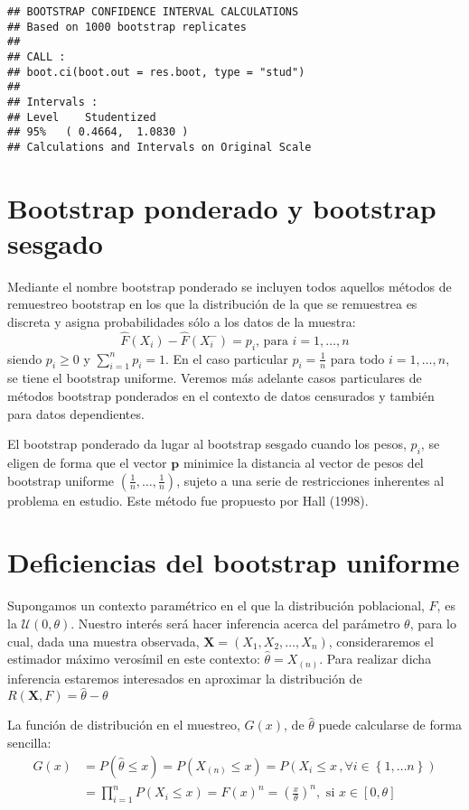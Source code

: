 \documentclass[]{book}
\theoremstyle{break}
\theoremstyle{definition}
\theoremstyle{definition}
\theoremstyle{definition}
\theoremstyle{remark}
\begin{document}
\begin{verbatim}
## BOOTSTRAP CONFIDENCE INTERVAL CALCULATIONS
## Based on 1000 bootstrap replicates
## 
## CALL : 
## boot.ci(boot.out = res.boot, type = "stud")
## 
## Intervals : 
## Level    Studentized     
## 95%   ( 0.4664,  1.0830 )  
## Calculations and Intervals on Original Scale
\end{verbatim}

\section{Bootstrap ponderado y bootstrap
sesgado}\label{bootstrap-ponderado-y-bootstrap-sesgado}

Mediante el nombre bootstrap ponderado se incluyen todos aquellos
métodos de remuestreo bootstrap en los que la distribución de la que se
remuestrea es discreta y asigna probabilidades sólo a los datos de la
muestra:
\[\hat{F}\left( X_i \right) -\hat{F}\left( X_i^{-} \right) = p_i
\text{, para }i=1,\ldots, n\] siendo \(p_i\geq 0\) y
\(\sum_{i=1}^{n}p_i=1\). En el caso particular \(p_i= \frac{1}{n}\) para
todo \(i=1,\ldots ,n\), se tiene el bootstrap uniforme. Veremos más
adelante casos particulares de métodos bootstrap ponderados en el
contexto de datos censurados y también para datos dependientes.

El bootstrap ponderado da lugar al bootstrap sesgado cuando los pesos,
\(p_i\), se eligen de forma que el vector \(\mathbf{p}\) minimice la
distancia al vector de pesos del bootstrap uniforme
\(\left( \frac{1}{n},\ldots ,\frac{1}{n} \right)\), sujeto a una serie
de restricciones inherentes al problema en estudio. Este método fue
propuesto por Hall (1998).

\section{Deficiencias del bootstrap uniforme}\label{deficien-unif}

Supongamos un contexto paramétrico en el que la distribución
poblacional, \(F\), es la \(\mathcal{U}\left( 0,\theta \right)\).
Nuestro interés será hacer inferencia acerca del parámetro \(\theta\),
para lo cual, dada una muestra observada,
\(\mathbf{X}=\left( X_1,X_2,\ldots ,X_n \right)\), consideraremos el
estimador máximo verosímil en este contexto: \(\hat{\theta}=X_{(n)}\).
Para realizar dicha inferencia estaremos interesados en aproximar la
distribución de \(R\left( \mathbf{X},F \right) =\hat{\theta}-\theta\)

La función de distribución en el muestreo, \(G\left( x \right)\), de
\(\hat{\theta}\) puede calcularse de forma sencilla:\[\begin{aligned}
G\left( x \right) &= P\left( \hat{\theta}\leq x \right) =P\left( X_{\left(
n \right)}\leq x \right) =P\left( X_i\leq x\,,\forall i\in \left\{ 1,\ldots
n\right\} \right) \\
&= \prod_{i=1}^{n}P\left( X_i\leq x \right) =F\left( x \right)^{n}=\left( 
\frac{x}{\theta } \right)^{n},\text{ si }x\in \left[ 0,\theta \right]\end{aligned}\]
\end{document}
